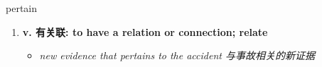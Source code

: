
\begin{frame}
{\huge pertain}
\begin{center}
\begin{enumerate}\Large
  \item \textbf{v. 有关联: to have a relation or connection; relate}
  \begin{itemize}
    \item \em{\Large{new evidence that pertains to the accident 与事故相关的新证据}}
  \end{itemize}
\end{enumerate}
\end{center}
\end{frame}
